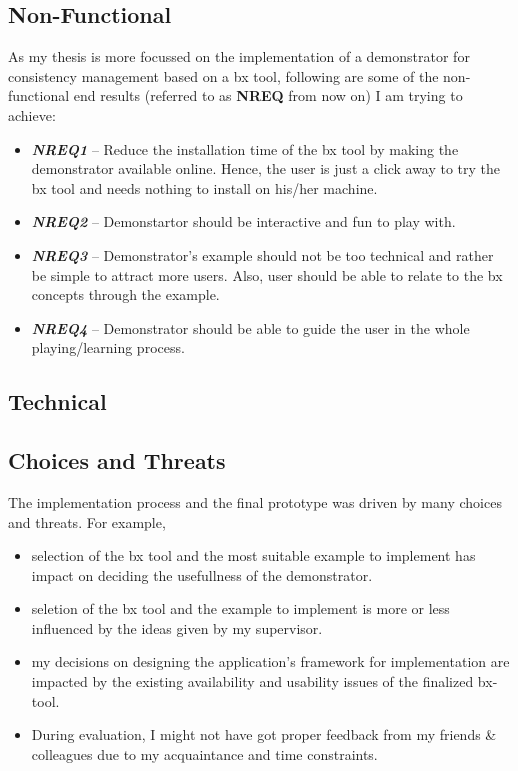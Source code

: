 \subsection{Non-Functional}\label{subsec:nonfunctionalreq}
As my thesis is more focussed on the implementation of a demonstrator for consistency management based on a bx tool, following are some of the non-functional end results (referred to as \textbf{NREQ} from now on) I am trying to achieve:
\begin{itemize} 
	\item {\textbf{\textit{NREQ1}} -- Reduce the installation time of the bx tool by making the demonstrator available online. Hence, the user is just a click away to try the bx tool and needs nothing to install on his/her machine.} 
	\item {\textbf{\textit{NREQ2}} -- Demonstartor should be interactive and fun to play with.}
	\item {\textbf{\textit{NREQ3}} -- Demonstrator's example should not be too technical and rather be simple to attract more users. Also, user should be able to relate to the bx concepts through the example.}
	\item {\textbf{\textit{NREQ4}} -- Demonstrator should be able to guide the user in the whole playing/learning process.}
\end{itemize}
\subsection{Technical}\label{subsec:technicalreq}

\subsection{Choices and Threats}\label{subsec:choicesthreats}
The implementation process and the final prototype was driven by many choices and threats. For example, 
\begin{itemize} 
	\item {selection of the bx tool and the most suitable example to implement has impact on deciding the usefullness of the demonstrator.}
	\item {seletion of the bx tool and the example to implement is more or less influenced by the ideas given by my supervisor.} 
	\item {my decisions on designing the application's framework for implementation are impacted by the existing availability and usability issues of the finalized bx-tool.}
	\item {During evaluation, I might not have got proper feedback from my friends \& colleagues due to my acquaintance and time constraints.}
\end{itemize}











